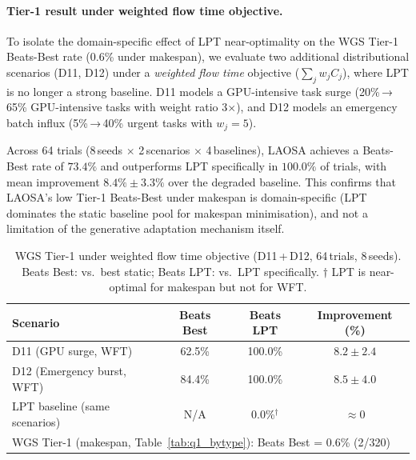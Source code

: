 \paragraph{Tier-1 result under weighted flow time objective.}
To isolate the domain-specific effect of LPT near-optimality on the WGS
Tier-1 Beats-Best rate (0.6\% under makespan), we evaluate two additional
distributional scenarios (D11, D12) under a \emph{weighted flow time}
objective ($\sum_j w_j C_j$), where LPT is no longer a strong baseline.
D11 models a GPU-intensive task surge (20\%\,→\,65\% GPU-intensive tasks
with weight ratio 3$\times$), and D12 models an emergency batch influx
(5\%\,→\,40\% urgent tasks with $w_j = 5$).

Across 64 trials (8\,seeds $\times$ 2\,scenarios
$\times$ 4\,baselines), LAOSA achieves a
Beats-Best rate of
$\mathbf{73.4\%}$
and outperforms LPT specifically in
$\mathbf{100.0\%}$
of trials, with mean improvement
$8.4\% \pm 3.3\%$
over the degraded baseline.
This confirms that LAOSA's low Tier-1 Beats-Best under makespan
is domain-specific (LPT dominates the static baseline pool for
makespan minimisation), and not a limitation of the generative
adaptation mechanism itself.

\begin{table}[h]
\centering
\caption{WGS Tier-1 under weighted flow time objective
(D11\,+\,D12, 64\,trials, 8\,seeds).
Beats Best: vs.\ best static; Beats LPT: vs.\ LPT specifically.
$\dagger$ LPT is near-optimal for makespan but not for WFT.}
\label{tab:tier1_wft}
\small
\begin{tabular}{@{}lccc@{}}
\toprule
Scenario & Beats Best & Beats LPT & Improvement (\%) \\
\midrule
  D11 (GPU surge, WFT)           & 62.5\% & 100.0\% & $8.2\pm2.4$ \\
  D12 (Emergency burst, WFT)     & 84.4\% & 100.0\% & $8.5\pm4.0$ \\
  LPT baseline (same scenarios)  & N/A & 0.0\%$^{\dagger}$ & $\approx 0$ \\
\midrule
\multicolumn{4}{l}{\footnotesize
  WGS Tier-1 (makespan, Table~\ref{tab:q1_bytype}): Beats Best = 0.6\% (2/320)}\\
\bottomrule
\end{tabular}
\end{table}